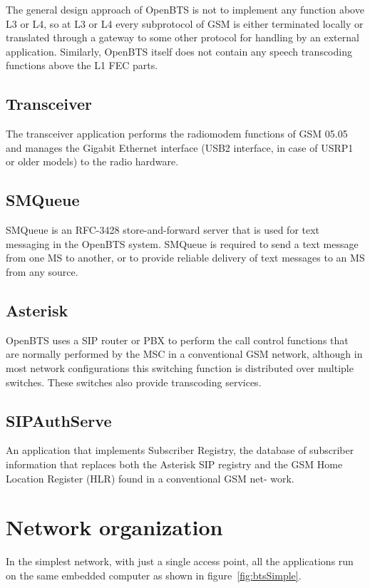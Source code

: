 The general design approach of OpenBTS is not to implement any function above L3 or L4, so at L3 or L4
every subprotocol of GSM is either terminated locally or translated through a gateway to some other protocol
for handling by an external application. Similarly, OpenBTS itself does not contain any speech transcoding
functions above the L1 FEC parts.


\subsection{Transceiver}
The transceiver application performs the radiomodem functions of GSM 05.05 and manages 
the Gigabit Ethernet interface
(USB2 interface, in case
of USRP1 or older models) to the radio hardware.

\subsection{SMQueue}
SMQueue is an RFC-3428 store-and-forward server that is used for 
text messaging in the OpenBTS system. SMQueue is required to send 
a text message from one MS to another, or to provide reliable 
delivery of text messages to an MS from any source.

\subsection{Asterisk}
OpenBTS uses a SIP router or PBX to perform the 
call control functions that are normally performed by the MSC
in a conventional GSM network, although in 
most network configurations this switching
function is distributed over multiple switches. 
These switches also provide transcoding services.

\subsection{SIPAuthServe}
An application that implements Subscriber Registry, the database of subscriber 
information that replaces both
the Asterisk SIP registry and the GSM Home Location Register (HLR) 
found in a conventional GSM net-
work.

\section{Network organization}
In the simplest network, with just a single access point, all the applications run
on the same embedded computer as shown in figure~\ref{fig:btsSimple}.

